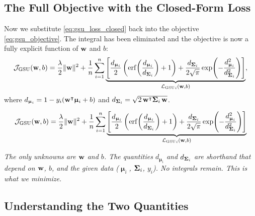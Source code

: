 \documentclass[11pt, letterpaper]{article}
\newcommand{\bSigma}{\vb{\Sigma}}
\newcommand{\bmu}{\boldsymbol{\upmu}}
\newcommand{\loss}{\mathcal{L}}
\newcommand{\obj}{\mathcal{J}}
\begin{document}
\subsection{The Full Objective with the Closed-Form Loss}\label{sec:gsu_full_objective}

Now we substitute \cref{eq:gsu_loss_closed} back into the objective \cref{eq:gsu_objective}. The integral has been eliminated and the objective is now a fully explicit function of $\vb{w}$ and $b$:
\begin{equation}\label{eq:gsu_objective_closed}
    \obj_{\text{GSU}} (\vb{w}, b) = \frac{\lambda}{2}\|\vb{w}\|^2 + \frac{1}{n}\sum_{i=1}^{n}\underbrace{\left[\frac{d_{\bmu_i}}{2}\left(\mathrm{erf}\!\left(\frac{d_{\bmu_i}}{d_{\bSigma_i}}\right) + 1\right) + \frac{d_{\bSigma_i}}{2\sqrt{\pi}}\exp\!\left(-\frac{d_{\bmu_i}^2}{d_{\bSigma_i}^2}\right)\right]}_{{\loss_{\text{GSU}}}_{i}(\vb{w}, b)},
\end{equation}
where $d_{\bmu_i} = 1 - y_i(\vb{w}^{\intercal} \bmu_i + b)$ and $d_{\bSigma_i} = \sqrt{2\, \vb{w}^{\intercal} \bSigma_i\, \vb{w}}$.

\begin{statusbox}
\vspace{-0.5em}
\begin{equation*}
    \obj_{\text{GSU}} (\vb{w}, b) = \frac{\lambda}{2}\|\vb{w}\|^2 + \frac{1}{n}\sum_{i=1}^{n}\underbrace{\left[\frac{d_{\bmu_i}}{2}\left(\mathrm{erf}\!\left(\frac{d_{\bmu_i}}{d_{\bSigma_i}}\right) + 1\right) + \frac{d_{\bSigma_i}}{2\sqrt{\pi}}\exp\!\left(-\frac{d_{\bmu_i}^2}{d_{\bSigma_i}^2}\right)\right]}_{{\loss_{\text{GSU}}}_{i}(\vb{w}, b)}
\end{equation*}
\vspace{-1em}
\begin{center}\small
\emph{The only unknowns are $\vb{w}$ and $b$. The quantities $d_{\bmu_i}$ and $d_{\bSigma_i}$ are shorthand that depend on $\vb{w}$, $b$, and the given data ($\bmu_i$, $\bSigma_i$, $y_i$). No integrals remain. This is what we minimize.}
\end{center}
\end{statusbox}

\subsection{Understanding the Two Quantities}\label{sec:understanding_d}
\end{document}
